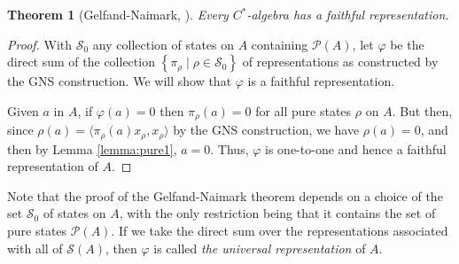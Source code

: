 \documentclass[11pt,a4paper]{report}
\theoremstyle{plain}
\newtheorem{thm}{Theorem}
\theoremstyle{definition}
\newcommand{\1}{\mathbbm{1}}
\renewcommand{\phi}{\varphi}
\renewcommand{\S}{\mathscr{S}}
\renewcommand{\P}[1]{\mathscr{P}(#1)}
\begin{document}
\begin{thm}[Gelfand-Naimark, {\cite[4.5.6]{kadison83}}] \label{thm:gn}
	Every $C^\ast$-algebra has a faithful representation.
\end{thm}
\begin{proof}
	With $\S_0$ any collection of states on $A$ containing $\P{A}$, let $\phi$ be the direct sum of
	the collection $\left\{\pi_\rho \mid \rho\in\S_0\right\}$ of representations as constructed by the GNS
	construction. We will show that $\phi$ is a faithful representation.
	
	Given $a$ in $A$, if $\phi(a)=0$ then $\pi_\rho(a)=0$ for all pure states $\rho$ on $A$. But then,
	since $\rho(a)=\langle \pi_\rho (a) x_\rho, x_\rho \rangle$ by the GNS construction, we have 
	$\rho(a)=0$, and then by Lemma \ref{lemma:pure1}, $a=0$. Thus, $\phi$ is one-to-one and hence a 
	faithful representation of $A$.
\end{proof}

Note that the proof of the Gelfand-Naimark theorem depends on a choice of the set $\S_0$ of states on 
$A$, with the only restriction being that it contains the set of pure states $\P A$. If we take the 
direct sum over the representations associated with all of $\S (A)$, then $\phi$ is called \emph{the 
universal representation} of $A$.
\end{document}
